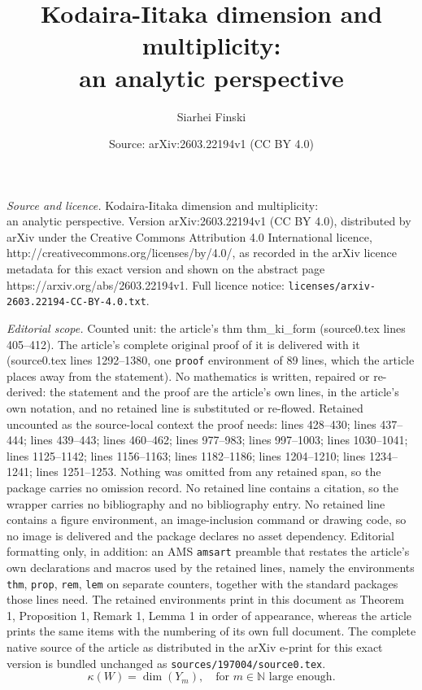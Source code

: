 \documentclass[10pt,a4paper]{amsart}
\title{\vspace*{-1.5cm} Kodaira-Iitaka dimension and multiplicity: \\ an analytic perspective}
\author{Siarhei Finski}
\date{Source: arXiv:2603.22194v1 (CC BY 4.0)}
\newcommand{\nat}{\mathbb{N}}
\begin{document}
\maketitle

\noindent\emph{Source and licence.} \vspace*{-1.5cm} Kodaira-Iitaka dimension and multiplicity: \\ an analytic perspective. Version arXiv:2603.22194v1 (CC BY 4.0), distributed by arXiv under the Creative Commons Attribution 4.0 International licence, http://creativecommons.org/licenses/by/4.0/, as recorded in the arXiv licence metadata for this exact version and shown on the abstract page https://arxiv.org/abs/2603.22194v1. Full licence notice: \texttt{licenses/arxiv-2603.22194-CC-BY-4.0.txt}.\par\smallskip

\noindent\textit{Editorial scope.} Counted unit: the article's thm thm\_ki\_form (source0.tex lines 405--412). The article's complete original proof of it is delivered with it (source0.tex lines 1292--1380, one \texttt{proof} environment of 89 lines, which the article places away from the statement). No mathematics is written, repaired or re-derived: the statement and the proof are the article's own lines, in the article's own notation, and no retained line is substituted or re-flowed.  Retained uncounted as the source-local context the proof needs: lines 428--430; lines 437--444; lines 439--443; lines 460--462; lines 977--983; lines 997--1003; lines 1030--1041; lines 1125--1142; lines 1156--1163; lines 1182--1186; lines 1204--1210; lines 1234--1241; lines 1251--1253.  Nothing was omitted from any retained span, so the package carries no omission record.  No retained line contains a citation, so the wrapper carries no bibliography and no bibliography entry.  No retained line contains a figure environment, an image-inclusion command or drawing code, so no image is delivered and the package declares no asset dependency.  Editorial formatting only, in addition: an AMS \texttt{amsart} preamble that restates the article's own declarations and macros used by the retained lines, namely the environments \texttt{thm}, \texttt{prop}, \texttt{rem}, \texttt{lem} on separate counters, together with the standard packages those lines need.  The retained environments print in this document as Theorem 1, Proposition 1, Remark 1, Lemma 1 in order of appearance, whereas the article prints the same items with the numbering of its own full document.  The complete native source of the article as distributed in the arXiv e-print for this exact version is bundled unchanged as \texttt{sources/197004/source0.tex}.
	\begin{equation}\label{eq_dim_ki_yk}
		\kappa(W) = \dim(Y_m), \quad \text{for } m \in \nat \text{ large enough}.
	\end{equation}
\end{document}

